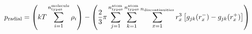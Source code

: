 \documentclass[12pt]{article}
\begin{document}
\begin{displaymath}
p_{\rm radial} = 
{
\left(
k T \sum_{i=1}^{n^{\rm molecule}_{\rm types}} \rho_{i}
\right)
}
-
{
\left(
{{2}\over{3}} \pi
\sum_{j=1}^{n^{\rm atom}_{\rm types}}
\sum_{k=1}^{n^{\rm atom}_{\rm types}}
\sum_{x=1}^{n_{\rm discontinuities}} 
r_{x}^{3}
\left[
g_{jk}(r_{x}^{-}) - g_{jk}(r_{x}^{+})
\right]
\right)
}
\end{displaymath}
\end{document}
